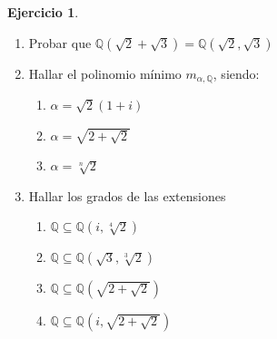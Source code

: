 \documentclass[10pt, spanish]{report}
\theoremstyle{definition}
\theoremstyle{custom}
\newtheorem*{ejer}{Ejercicio}
\theoremstyle{remark}
\newcommand{\Q}{\mathbb{Q}}
\begin{document}
\begin{ejer}\hspace{0pt}
    \begin{enumerate}
        \item Probar que $\Q(\sqrt{2}+\sqrt{3})=\Q(\sqrt{2},\sqrt{3})$
        \item Hallar el polinomio mínimo $m_{\alpha,\Q}$, siendo:
            \begin{multicols}{4}
                \begin{enumerate}
                    \item $\alpha=\sqrt{2}(1+i)$
                    \item $\alpha=\sqrt{2+\sqrt{2}}$
                    \item $\alpha=\sqrt[n]{2}$
                \end{enumerate}
            \end{multicols}
        \item Hallar los grados de las extensiones
            \begin{multicols}{2}
                \begin{enumerate}
                    \item $\Q\subseteq\Q(i,\sqrt[4]{2})$
                    \item $\Q\subseteq\Q\left(\sqrt{3},\sqrt[3]{2}\right)$
                    \item $\Q\subseteq\Q\left(\sqrt{2+\sqrt{2}}\right)$
                    \item $\Q\subseteq\Q\left(i,\sqrt{2+\sqrt{2}}\right)$
                \end{enumerate}
            \end{multicols}
    \end{enumerate}
\end{ejer}
\end{document}
